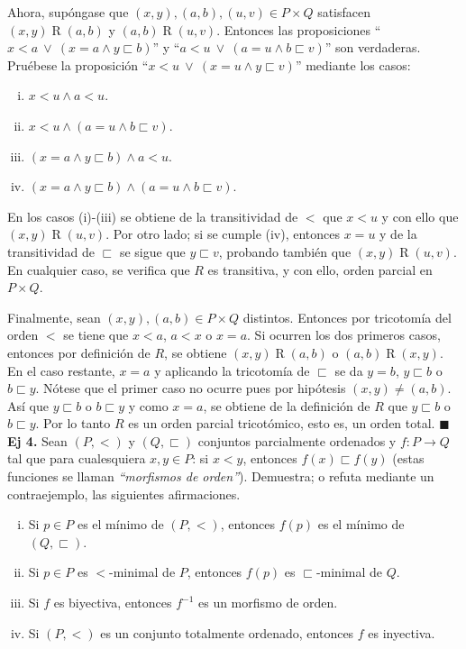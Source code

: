 \documentclass[11pt]{article}
\newcommand{\QED}{\hfill\ensuremath{\blacksquare}}
\begin{document}
  Ahora, supóngase que $(x,y),(a,b),(u,v) \in P \times Q$ satisfacen $(x,y) \mathrel{R} (a,b)$ y $(a,b) \mathrel{R} (u,v)$. Entonces las proposiciones ``$x<a \: \lor \: (x=a \land y \sqsubset b) $'' y ``$a<u \: \lor \: (a=u \land b \sqsubset v) $'' son verdaderas. Pruébese la proposición ``$x<u \: \lor \: (x=u \land y \sqsubset v) $'' mediante los casos:
  \begin{multicols}{2}
    \begin{enumerate}[i)]
        \item $x<u \land a<u$.
        \item $x<u \land (a=u \land b \sqsubset v)$.
        \item $(x=a \land y \sqsubset b) \land a<u$.
        \item $(x=a \land y \sqsubset b) \land (a=u \land b \sqsubset v)$.
    \end{enumerate}
  \end{multicols}

  En los casos (i)-(iii) se obtiene de la transitividad de $<$ que $x<u$ y con ello que $(x,y) \mathrel{R} (u,v)$. Por otro lado; si se cumple (iv), entonces $x=u$ y de la transitividad de $\sqsubset$ se sigue que $y \sqsubset v$, probando también que $(x,y) \mathrel{R} (u,v)$. En cualquier caso, se verifica que $R$ es transitiva, y con ello, orden parcial en $P \times Q$.

  Finalmente, sean $(x,y),(a,b) \in P \times Q$ distintos. Entonces por tricotomía del orden $<$ se tiene que $x<a$, $a<x$ o $x=a$. Si ocurren los dos primeros casos, entonces por definición de $R$, se obtiene $(x,y) \mathrel{R} (a,b)$ o $(a,b) \mathrel{R} (x,y)$. En el caso restante, $x=a$ y aplicando la tricotomía de $\sqsubset$ se da $y=b$, $y \sqsubset b$ o $b \sqsubset y$. Nótese que el primer caso no ocurre pues por hipótesis $(x,y)\neq (a,b)$. Así que $y \sqsubset b$ o $b \sqsubset y$ y como $x=a$, se obtiene de la definición de $R$ que $y \sqsubset b$ o $b \sqsubset y$. Por lo tanto $R$ es un orden parcial tricotómico, esto es, un orden total. \QED \\

  \textbf{Ej 4.} Sean $(P,<)$ y $(Q,\sqsubset)$ conjuntos parcialmente ordenados y $f:P \to Q$ tal que para cualesquiera $x,y \in P$: si $x<y$, entonces $f(x) \sqsubset f(y)$ (estas funciones se llaman \textit{``morfismos de orden''}). Demuestra; o refuta mediante un contraejemplo, las siguientes afirmaciones.
  \begin{enumerate}[i)]
    \item Si $p \in P$ es el mínimo de $(P,<)$, entonces $f(p)$ es el mínimo de $(Q,\sqsubset)$.
    \item Si $p \in P$ es $<$-minimal de $P$, entonces $f(p)$ es $\sqsubset$-minimal de $Q$.
    \item Si $f$ es biyectiva, entonces $f^{-1}$ es un morfismo de orden.
    \item Si $(P,<)$ es un conjunto totalmente ordenado, entonces $f$ es inyectiva.
  \end{enumerate}
\end{document}
